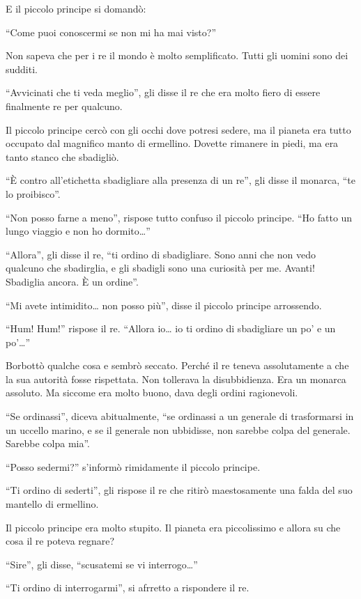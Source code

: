\documentclass[11pt]{scrbook}
\begin{document}
E il piccolo principe si domandò:

``Come puoi conoscermi se non mi ha mai visto?''

Non sapeva che per i re il mondo è molto semplificato. Tutti gli uomini sono dei sudditi.

``Avvicinati che ti veda meglio'', gli disse il re che era molto fiero di essere finalmente re per qualcuno.

Il piccolo principe cercò con gli occhi dove potresi sedere, ma il pianeta era tutto occupato dal magnifico manto di ermellino. Dovette rimanere in piedi, ma era tanto stanco che sbadigliò.

``È contro all'etichetta sbadigliare alla presenza di un re'', gli disse il monarca, ``te lo proibisco''.

``Non posso farne a meno'', rispose tutto confuso il piccolo principe. ``Ho fatto un lungo viaggio e non ho dormito\ldots{}''

``Allora'', gli disse il re, ``ti ordino di sbadigliare. Sono anni che non vedo qualcuno che sbadirglia, e gli sbadigli sono una curiosità per me. Avanti! Sbadiglia ancora. È un ordine''.

``Mi avete intimidito\ldots{} non posso più'', disse il piccolo principe arrossendo.

``Hum! Hum!'' rispose il re. ``Allora io\ldots{} io ti ordino di sbadigliare un po' e un po'\ldots{}''

Borbottò qualche cosa e sembrò seccato. Perché il re teneva assolutamente a che la sua autorità fosse rispettata. Non tollerava la disubbidienza. Era un monarca assoluto. Ma siccome era molto buono, dava degli ordini ragionevoli.

``Se ordinassi'', diceva abitualmente, ``se ordinassi a un generale di trasformarsi in un uccello marino, e se il generale non ubbidisse, non sarebbe colpa del generale. Sarebbe colpa mia''.

``Posso sedermi?'' s'informò rimidamente il piccolo principe.

``Ti ordino di sederti'', gli rispose il re che ritirò maestosamente una falda del suo mantello di ermellino.

Il piccolo principe era molto stupito. Il pianeta era piccolissimo e allora su che cosa il re poteva regnare?

``Sire'', gli disse, ``scusatemi se vi interrogo\ldots{}''

``Ti ordino di interrogarmi'', si afrretto a rispondere il re.
\end{document}

